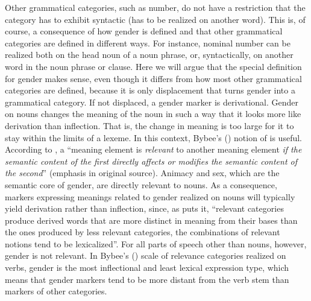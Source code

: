 \documentclass[output=collectionpaper]{langsci/langscibook}
\begin{document}
Other grammatical categories, such as number, do not have a restriction that the category has to exhibit syntactic  (has to be realized on another word). This is, of course, a consequence of how gender is defined and that other grammatical categories are defined in different ways. For instance, nominal number can be realized both on the head noun of a noun phrase, or, syntactically, on another word in the noun phrase or clause. Here we will argue that the special definition for gender makes sense, even though it differs from how most other grammatical categories are defined, because it is only displacement that turns gender into a grammatical category. If not displaced, a gender marker is derivational. Gender on nouns changes the meaning of the noun in such a way that it looks more like derivation than inflection. That is, the change in meaning is too large for it to stay within the limits of a lexeme. In this context, Bybee's (\citeyear{Bybee1985a}) notion of  is useful. According to \cite[13]{Bybee1985a}, a ``meaning element is \emph{relevant} to another meaning element \emph{if the semantic content of the first directly affects or modifies the semantic content of the second}'' (emphasis in original source). Animacy and sex, which are the semantic core of gender, are directly relevant to nouns. As a consequence, markers expressing meanings related to gender realized on nouns will typically yield derivation rather than inflection, since, as \cite[17]{Bybee1985a} puts it, ``relevant categories produce derived words that are more distinct in meaning from their bases than the ones produced by less relevant categories, the combinations of relevant notions tend to be lexicalized''. For all parts of speech other than nouns, however, gender is not relevant. In Bybee's (\citeyear{Bybee1985a}) scale of relevance categories realized on verbs, gender is the most inflectional and least lexical expression type, which means that gender markers tend to be more distant from the verb stem than markers of other categories.
\end{document}
